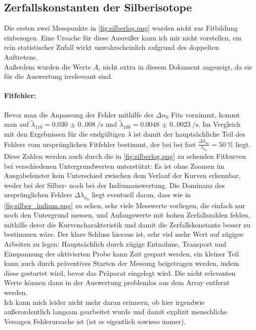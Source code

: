 \subsection{Zerfallskonstanten der Silberisotope}
Die ersten zwei Messpunkte in \cref{fig:silberlog.png} wurden nicht zur Fitbildung einbezogen. Eine Ursache für diese Ausreißer kann ich mir nicht vorstellen, ein rein statistischer Zufall wirkt unwahrscheinlich aufgrund des doppelten Auftretens.\\
Außerdem wurden die Werte \(A_i\) nicht extra in diesem Dokument angezeigt, da sie für die Auswertung irreleveant sind. 

\paragraph{Fitfehler:} Bevor man die Anpassung der Fehler mithilfe der \(\Delta n_0\) Fits vornimmt, kommt man auf \(\tilde{\lambda}_{110}=\qty{0.030(0.008)}{\per\s}\) und \(\tilde{\lambda}_{108}=\qty{0.0048(0.0023)}{\per\s}\). Im Vergleich mit den Ergebnissen für die endgültigen \(\lambda\) ist damit der hauptsächliche Teil des Fehlers vom ursprünglichen Fitfehler bestimmt, der bei  bei fast \(\frac{\Delta \lambda_{n_0}}{\lambda_{n_0}}=\qty{50}{\percent}\) liegt. Diese Zahlen werden auch durch die in \cref{fig:silberlog.png} zu sehenden Fitkurven bei verschiedenen Untergrundwerten unterstützt: Es ist ohne Zoomen im Ausgabefenster kein Unterschied zwischen dem Verlauf der Kurven erkennbar, weder bei der Silber- noch bei der Indiumauswertung.  
Die Dominanz des ursprünglichen Fehlers \(\Delta \lambda_{n_0}\) liegt eventuell daran, dass wie in \cref{fig:silber_indium.png} zu sehen, sehr viele Messwerte vorliegen, die einfach nur noch den Untergrund messen, und Anfangswerte mit hohen Zerfallszahlen fehlen, mithilfe derer die Kurvencharakteristik und damit die Zerfallskonstante besser zu bestimmen wäre. Der klare Schluss hieraus ist, sehr viel mehr Wert auf zügiges Arbeiten zu legen: Hauptsächlich durch zügige Entnahme, Transport und Einspannung der aktivierten Probe kann Zeit gespart werden, ein kleiner Teil kann auch durch präventives Starten der Messung beigetragen werden, indem diese gestartet wird, bevor das Präparat eingelegt wird. Die nicht relevanten Werte können dann in der Auswertung problemlos aus dem Array entfernt werden.\\
Ich kann mich leider nicht mehr daran erinnern, ob hier irgendwie außerordentlich langsam gearbeitet wurde und damit explizit menschliche Versagen Fehlerursache ist (ist es eigentlich sowieso immer).

